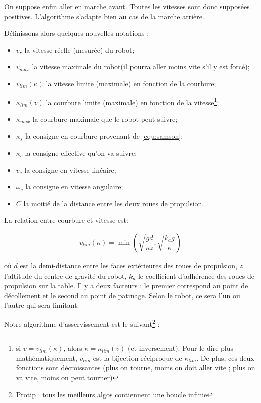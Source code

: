 \documentclass[11pt]{article}
\begin{document}
    On suppose enfin aller en marche avant.
    Toutes les vitesses sont donc supposées positives.
    L'algorithme s'adapte bien au cas de la marche arrière.

    Définissons alors quelques nouvelles notations :
    \begin{itemize}
        \item $v_r$ la vitesse réelle (mesurée) du robot;
        \item $v_{max}$ la vitesse maximale du robot(il pourra aller moins vite s'il y est forcé);
        \item $v_{lim}(\kappa)$ la vitesse limite (maximale) en fonction de la courbure;
        \item $\kappa_{lim}(v)$ la courbure limite (maximale) en fonction de la vitesse\footnote{si $v = v_{lim}(\kappa)$, alors $\kappa = \kappa_{lim}(v)$ (et inversement). Pour le dire plus mathématiquement, $v_{lim}$ est la bijection réciproque de $\kappa_{lim}$. De plus, ces deux fonctions sont décroissantes (plus on tourne, moins on doit aller vite ; plus on va vite, moins on peut tourner)};
        \item $\kappa_{max}$ la courbure maximale que le robot peut suivre;
        \item $\kappa_s$ la consigne en courbure provenant de \eqref{equ:samson};
        \item $\kappa_c$ la consigne effective qu'on va suivre;
        \item $v_c$ la consigne en vitesse linéaire;
        \item $\omega_c$ la consigne en vitesse angulaire;
        \item $C$ la moitié de la distance entre les deux roues de propulsion.
    \end{itemize}

    La relation entre courbure et vitesse est:

    $$v_{lim}(\kappa) = \min\left(\sqrt{\frac{gd}{\kappa z}}, \sqrt{\frac{k_ag}{\kappa}}\right)$$

    où $d$ est la demi-distance entre les faces extérieures des roues de propulsion, $z$ l'altitude du centre de gravité du robot, $k_a$ le coefficient d'adhérence des roues de propulsion sur la table. Il y a deux facteurs : le premier correspond au point de décollement et le second au point de patinage. Selon le robot, ce sera l'un ou l'autre qui sera limitant.

    Notre algorithme d'asservissement est le suivant\footnote{Protip : tous les meilleurs algos contiennent une boucle infinie} :
\end{document}
